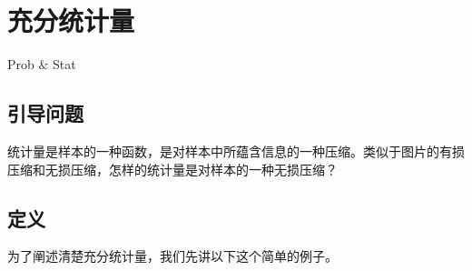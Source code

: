 \chapter{充分统计量}
\begin{introduction}
	\item Prob $\&$ Stat
\end{introduction}
\section{引导问题}
统计量是样本的一种函数，是对样本中所蕴含信息的一种压缩。类似于图片的有损压缩和无损压缩，怎样的统计量是对样本的一种无损压缩？


\section{定义}
为了阐述清楚充分统计量，我们先讲以下这个简单的例子。
